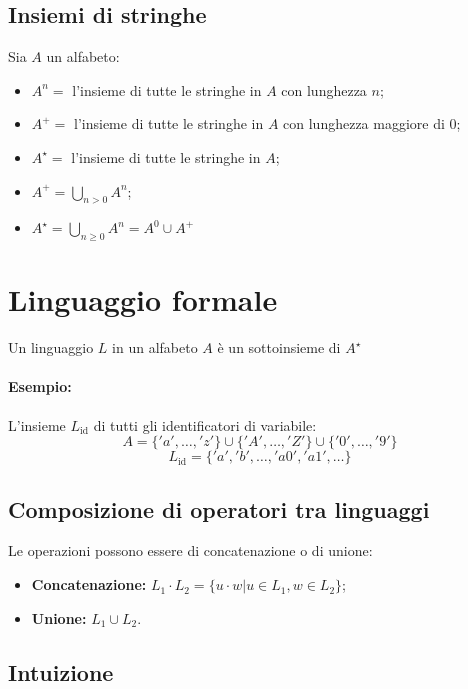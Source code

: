 \subsection{Insiemi di stringhe}
\begin{theorem}
  Sia $A$ un alfabeto:
  \begin{itemize}
    \item $A^n =$ l'insieme di tutte le stringhe in $A$ con lunghezza $n$;
    \item $A^+ =$ l'insieme di tutte le stringhe in $A$ con lunghezza maggiore
      di $0$;
    \item $A^\star =$ l'insieme di tutte le stringhe in $A$;
    \item $A^+ = \bigcup_{n>0}A^n$;
    \item $A^\star = \bigcup_{n\geq0}A^n=A^0\cup A^+$
  \end{itemize}
\end{theorem}

\section{Linguaggio formale}
\begin{theorem}
  Un linguaggio $L$ in un alfabeto $A$ è un sottoinsieme di $A^\star$
\end{theorem}

\paragraph{Esempio:}
L'insieme $L_{\text{id}}$ di tutti gli identificatori di variabile:
\[A=\{'a',\dots,'z'\}\cup\{'A',\dots,'Z'\}\cup\{'0',\dots,'9'\}\]
\[L_{\text{id}}=\{'a','b',\dots,'a0','a1',\dots\}\]

\subsection{Composizione di operatori tra linguaggi}
Le operazioni possono essere di concatenazione o di unione:
\begin{itemize}
  \item \textbf{Concatenazione:} $L_1\cdot L_2 = \{u\cdot w|u\in L_1, w\in L_2\}$;
  \item \textbf{Unione:} $L_1\cup L_2$.
\end{itemize}

\subsection{Intuizione}
